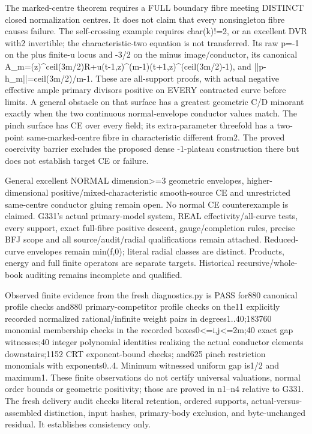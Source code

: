 \documentclass[11pt]{article}
\begin{document}
The marked-centre theorem requires a FULL boundary fibre meeting DISTINCT closed normalization centres. It does not claim that every nonsingleton fibre causes failure. The self-crossing example requires char(k)!=2, or an excellent DVR with2 invertible; the characteristic-two equation is not transferred. Its raw p=-1 on the plus finite-u locus and -3/2 on the minus image/conductor, its canonical A\_m=(z)\textasciicircum{}ceil(3m/2)R+u(t-1,z)\textasciicircum{}(m-1)(t+1,z)\textasciicircum{}(ceil(3m/2)-1), and ||p-h\_m||=ceil(3m/2)/m-1. These are all-support proofs, with actual negative effective ample primary divisors positive on EVERY contracted curve before limits. A general obstacle on that surface has a greatest geometric C/D minorant exactly when the two continuous normal-envelope conductor values match. The pinch surface has CE over every field; its extra-parameter threefold has a two-point same-marked-centre fibre in characteristic different from2. The proved coercivity barrier excludes the proposed dense -1-plateau construction there but does not establish target CE or failure.

General excellent NORMAL dimension\textgreater{}=3 geometric envelopes, higher-dimensional positive/mixed-characteristic smooth-source CE and unrestricted same-centre conductor gluing remain open. No normal CE counterexample is claimed. G331's actual primary-model system, REAL effectivity/all-curve tests, every support, exact full-fibre positive descent, gauge/completion rules, precise BFJ scope and all source/audit/radial qualifications remain attached. Reduced-curve envelopes remain min(f,0); literal radial classes are distinct. Products, energy and full finite operators are separate targets. Historical recursive/whole-book auditing remains incomplete and qualified.

Observed finite evidence from the fresh diagnostics.py is PASS for880 canonical profile checks and880 primary-competitor profile checks on the11 explicitly recorded normalized rational/infinite weight pairs in degrees1..40;183760 monomial membership checks in the recorded boxes0\textless{}=i,j\textless{}=2m;40 exact gap witnesses;40 integer polynomial identities realizing the actual conductor elements downstairs;1152 CRT exponent-bound checks; and625 pinch restriction monomials with exponents0..4. Minimum witnessed uniform gap is1/2 and maximum1. These finite observations do not certify universal valuations, normal order bounds or geometric positivity; those are proved in n1--n4 relative to G331. The fresh delivery audit checks literal retention, ordered supports, actual-versus-assembled distinction, input hashes, primary-body exclusion, and byte-unchanged residual. It establishes consistency only.
\end{document}
